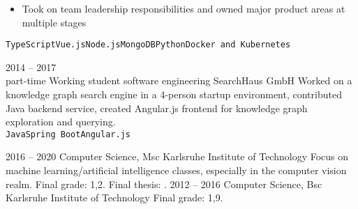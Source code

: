 \documentclass[8pt]{developercv} %
\newcommand{\linebreaksmall}{\vspace{2mm}}
\begin{document}
\begin{entrylist}
{\begin{itemize}[nosep, topsep=0pt, left=5pt, after=\vspace{6pt}]
			\item Took on team leadership responsibilities and owned major product areas at multiple stages
		\end{itemize}
		 \texttt{TypeScript}\slashsep\texttt{Vue.js}\slashsep\texttt{Node.js}\slashsep\texttt{MongoDB}\slashsep\texttt{Python}\slashsep\texttt{Docker and Kubernetes}} \linebreaksmall
	\entry
		{2014 -- 2017\\\footnotesize{part-time}}
		{Working student software engineering}
		{SearchHaus GmbH}
		{Worked on a knowledge graph search engine in a 4-person startup environment, contributed Java backend service, created Angular.js frontend for knowledge graph exploration and querying.
		\linebreaksmall \\ \texttt{Java}\slashsep\texttt{Spring Boot}\slashsep\texttt{Angular.js}}
\end{entrylist}



\begin{entrylist}
	\entry
		{2016 -- 2020}
		{Computer Science, Msc}
		{Karlsruhe Institute of Technology}
		{Focus on machine learning/artificial intelligence classes, especially in the computer vision realm. Final grade: 1,2. Final thesis: .}
	\entry
		{2012 -- 2016}
		{Computer Science, Bsc}
		{Karlsruhe Institute of Technology}
		{Final grade: 1,9.}
\end{entrylist}

\end{document}

